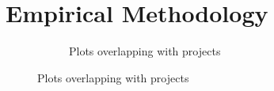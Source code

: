 \documentclass[12pt]{article}
\begin{document}
\section{Empirical Methodology}\label{section:methodology}


\begin{figure}[hbtp]
    \caption{Measuring Spatial Exposure to \\ Example Housing Projects}
    \label{fig:spatialexposure}
    \centering
    \vspace{2mm}
    \begin{subfigure}[b]{.8\textwidth}
        \centering
        \caption[]{\small Plots overlapping with projects}  
        \vspace{-1mm}


\end{subfigure}
\end{figure}
\end{document}

